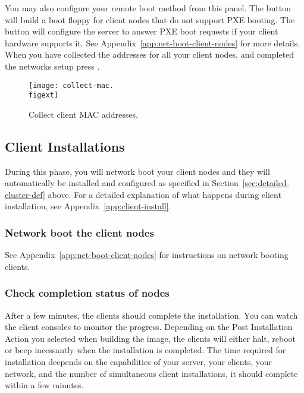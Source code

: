   You may also configure your remote boot method from this panel. The
   button will build a boot floppy for
  client nodes that do not support PXE booting. The  button will configure the server to answer PXE boot requests if
  your client hardware supports it. See Appendix~\ref{app:net-boot-client-nodes}
  for more details.
  When you have collected the
  addresses for all your client nodes, and completed the networks setup
  press .

\begin{figure}[htbp]
  \begin{center}
    \texttt{[image: collect-mac.\\figext]}
    \caption{Collect client MAC addresses.}
    \label{fig:detailed-collect-mac}
  \end{center}
\end{figure}


\subsection{Client Installations}

During this phase, you will network boot your client nodes and they
will automatically be installed and configured as specified in
Section~\ref{sec:detailed-cluster-def} above. For a detailed
explanation of what happens during client installation, see
Appendix~\ref{app:client-install}.

\subsubsection{Network boot the client nodes}

See Appendix~\ref{app:net-boot-client-nodes} for instructions on
network booting clients.

\subsubsection{Check completion status of nodes}

After a few minutes, the clients should complete the installation.
You can watch the client consoles to monitor the progress. Depending
on the Post Installation Action you selected when building the image,
the clients will either halt, reboot or beep incessantly when the 
installation is completed. 
The time required for installation deepends on the capabilities of
your server, your clients, your network, and the number of simultaneous 
client installations, it should complete within a few minutes.
  
